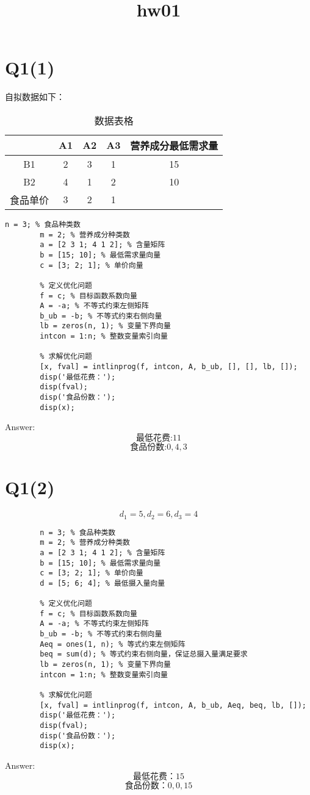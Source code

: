 \documentclass{article}
\title{hw01}
\begin{document}
\maketitle
    \section*{Q1(1)}
    自拟数据如下：
    \begin{table}[h]
      \centering
      \begin{tabular}{|c|c|c|c|c|}
      \hline
       & A1 & A2 & A3 & 营养成分最低需求量 \\
      \hline
      B1 & 2 & 3 & 1 & 15 \\
      \hline
      B2 & 4 & 1 & 2 & 10 \\
      \hline
      食品单价 & 3 & 2 & 1 &  \\
      \hline
      \end{tabular}
      \caption{数据表格}
  \end{table}
    \begin{lstlisting}[caption={题1(1) MATLAB代码}, label={lst:matlab}]
        n = 3; % 食品种类数
        m = 2; % 营养成分种类数
        a = [2 3 1; 4 1 2]; % 含量矩阵
        b = [15; 10]; % 最低需求量向量
        c = [3; 2; 1]; % 单价向量

        % 定义优化问题
        f = c; % 目标函数系数向量
        A = -a; % 不等式约束左侧矩阵
        b_ub = -b; % 不等式约束右侧向量
        lb = zeros(n, 1); % 变量下界向量
        intcon = 1:n; % 整数变量索引向量

        % 求解优化问题
        [x, fval] = intlinprog(f, intcon, A, b_ub, [], [], lb, []);
        disp('最低花费：');
        disp(fval);
        disp('食品份数：');
        disp(x);

    \end{lstlisting}
    Answer:
      \[\text{最低花费:}11\]
      \[\text{食品份数:}0, 4, 3\]
    \section*{Q1(2)}
      \[d_1=5, d_2=6, d_3=4\]
      \begin{lstlisting}[caption={题1(1) MATLAB代码}, label={lst:matlab}]
        % 手动输入数据
        n = 3; % 食品种类数
        m = 2; % 营养成分种类数
        a = [2 3 1; 4 1 2]; % 含量矩阵
        b = [15; 10]; % 最低需求量向量
        c = [3; 2; 1]; % 单价向量
        d = [5; 6; 4]; % 最低摄入量向量

        % 定义优化问题
        f = c; % 目标函数系数向量
        A = -a; % 不等式约束左侧矩阵
        b_ub = -b; % 不等式约束右侧向量
        Aeq = ones(1, n); % 等式约束左侧矩阵
        beq = sum(d); % 等式约束右侧向量，保证总摄入量满足要求
        lb = zeros(n, 1); % 变量下界向量
        intcon = 1:n; % 整数变量索引向量

        % 求解优化问题
        [x, fval] = intlinprog(f, intcon, A, b_ub, Aeq, beq, lb, []);
        disp('最低花费：');
        disp(fval);
        disp('食品份数：');
        disp(x);

      \end{lstlisting}
    Answer:
      \[\text{最低花费：}15\]
      \[\text{食品份数：}0, 0, 15\]
\end{document}
